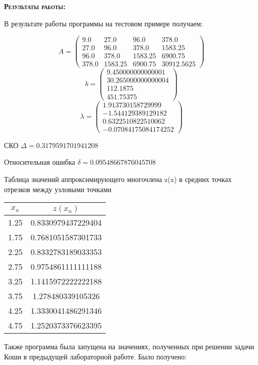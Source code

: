 \documentclass [12pt]{article}
\begin{document}
\textsc{\textbf{Результаты работы:}}

В результате работы программы на тестовом примере получаем:

\[
  A =
  \begin{pmatrix}
    9.0 & 27.0 & 96.0 & 378.0\\
    27.0 & 96.0 & 378.0 & 1583.25\\
    96.0 & 378.0 & 1583.25 & 6900.75\\
    378.0 & 1583.25 & 6900.75 & 30912.5625
  \end{pmatrix}
\]
\[
  b =
  \begin{pmatrix}
    9.450000000000001 \\
    30.265000000000004 \\
    112.1875 \\
    451.75375
  \end{pmatrix}
\]
\[
  \lambda =
  \begin{pmatrix}
    1.913730158729999 \\
    -1.544129389129182 \\
    0.6322510822510062 \\
    -0.07084175084174252
  \end{pmatrix}
\]

СКО $\Delta = 0.3179591701941208$

Относительная ошибка $\delta = 0.09548667876045708$

Таблица значений аппроксимирующего многочлена z(x) в средних точках отрезков между узловыми точками

\begin{center}
\begin{tabular}{|c|c|}
    \hline
    $x_n$ & $z(x_n)$ \\ \hline
    1.25 & 0.8330979437229404 \\ \hline
    1.75 & 0.7681051587301733 \\ \hline
    2.25 & 0.8332783189033353 \\ \hline
    2.75 & 0.9754861111111188 \\ \hline
    3.25 & 1.1415972222222188 \\ \hline
    3.75 & 1.278480339105326 \\ \hline
    4.25 & 1.3330041486291346 \\ \hline
    4.75 & 1.2520373376623395 \\ \hline
\end{tabular}
\end{center}

Также программа была запущена на значениях, полученных при решении задачи Коши в предыдущей лабораторной работе. Было получено:
\end{document}
